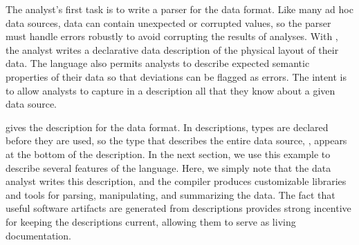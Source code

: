 The analyst's first task is to write a parser for the
\dibbler{} data  format.  Like many ad hoc data sources, \dibbler{} data
can contain unexpected or corrupted values, so the
parser must handle errors robustly to avoid corrupting the results of
analyses.  
With \pads{}, the analyst writes a declarative data description of the
physical layout of their data.  The language also permits analysts to
describe expected semantic properties of their data so that deviations
can be flagged as errors. The intent is to allow analysts to capture
in a \pads{} description all that they know about a given data source.

 gives the \pads{} description for the
\dibbler{} data format.  In \pads{} descriptions, types are declared
before they are used, so the type that describes the entire data
source, , appears at the bottom of the description.  In
the next section, we use this example to describe several features of
the \pads{} language.  Here, we simply note that the data analyst
writes this description, and the \pads{} compiler produces
customizable \C{} libraries and tools for parsing, manipulating, and
summarizing the data.  The fact that useful software artifacts are
generated from \pads{} descriptions provides strong incentive for
keeping the descriptions current, allowing them to serve as living
documentation.

